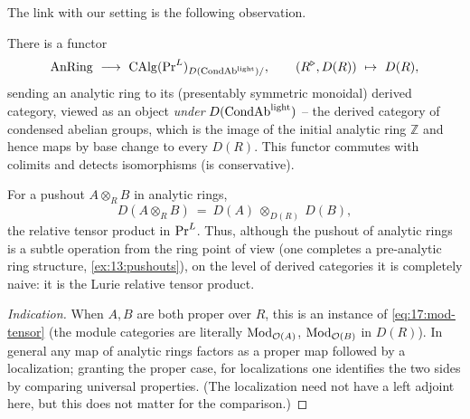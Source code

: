The link with our setting is the following observation.

\begin{proposition}
\label{prop:17:anring-to-PrL}
There is a functor
\begin{equation}
\label{eq:17:anring-to-PrL}
\operatorname{AnRing}\ \longrightarrow\ \operatorname{CAlg}(\mathrm{Pr}^{L})_{D(\mathrm{CondAb}^{\mathrm{light}})/},\qquad
(R^{\triangleright}, D(R))\ \mapsto\ D(R),
\end{equation}
sending an analytic ring to its (presentably symmetric monoidal) derived category, viewed
as an object \emph{under} $D(\mathrm{CondAb}^{\mathrm{light}})$ -- the derived category of condensed abelian groups,
which is the image of the initial analytic ring $\mathbb{Z}$ and hence maps by base change to
every $D(R)$. This functor commutes with colimits and detects isomorphisms (is
conservative).
\end{proposition}

\begin{corollary}
\label{cor:17:pushout-tensor}
For a pushout $A\otimes_{R}B$ in analytic rings,
\begin{equation*}
D(A\otimes_{R}B)\ =\ D(A)\ \otimes_{D(R)}\ D(B),
\end{equation*}
the relative tensor product in $\mathrm{Pr}^{L}$. Thus, although the pushout of analytic rings is a
subtle operation from the ring point of view (one completes a pre-analytic ring structure,
\cref{ex:13:pushouts}), on the level of derived categories it is completely naive: it is the
Lurie relative tensor product.
\end{corollary}

\begin{proof}[Indication]
When $A,B$ are both proper over $R$, this is an instance of \eqref{eq:17:mod-tensor}
(the module categories are literally $\operatorname{Mod}_{\mathcal O(A)}$, $\operatorname{Mod}_{\mathcal O(B)}$ in
$D(R)$). In general any map of analytic rings factors as a proper map followed by a
localization; granting the proper case, for localizations one identifies the two sides by
comparing universal properties. (The localization need not have a left adjoint here, but this
does not matter for the comparison.)
\end{proof}

